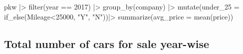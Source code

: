 \documentclass[
  letterpaper,
  DIV=11,
  numbers=noendperiod]{scrartcl}
\newenvironment{Shaded}{\begin{snugshade}}{\end{snugshade}}
\newcommand{\AttributeTok}[1]{\textcolor[rgb]{0.40,0.45,0.13}{#1}}
\newcommand{\DecValTok}[1]{\textcolor[rgb]{0.68,0.00,0.00}{#1}}
\newcommand{\FunctionTok}[1]{\textcolor[rgb]{0.28,0.35,0.67}{#1}}
\newcommand{\NormalTok}[1]{\textcolor[rgb]{0.00,0.23,0.31}{#1}}
\newcommand{\SpecialCharTok}[1]{\textcolor[rgb]{0.37,0.37,0.37}{#1}}
\newcommand{\StringTok}[1]{\textcolor[rgb]{0.13,0.47,0.30}{#1}}
\begin{document}
\begin{Shaded}
\begin{Highlighting}[]
\NormalTok{pkw }\SpecialCharTok{|\textgreater{}}
  \FunctionTok{filter}\NormalTok{(year }\SpecialCharTok{==} \DecValTok{2017}\NormalTok{) }\SpecialCharTok{|\textgreater{}}
  \FunctionTok{group\_by}\NormalTok{(company) }\SpecialCharTok{|\textgreater{}}
  \FunctionTok{mutate}\NormalTok{(}\AttributeTok{under\_25 =} \FunctionTok{if\_else}\NormalTok{(Mileage}\SpecialCharTok{\textless{}}\DecValTok{25000}\NormalTok{, }\StringTok{"Y"}\NormalTok{, }\StringTok{"N"}\NormalTok{))}\SpecialCharTok{|\textgreater{}}
  \FunctionTok{summarize}\NormalTok{(}\AttributeTok{avg\_price =} \FunctionTok{mean}\NormalTok{(price)) }
  
\end{Highlighting}
\end{Shaded}

\hypertarget{total-number-of-cars-for-sale-year-wise}{%
\subsection{Total number of cars for sale
year-wise}\label{total-number-of-cars-for-sale-year-wise}}
\end{document}
